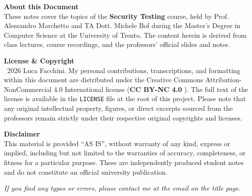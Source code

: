 \newpage
\thispagestyle{empty}
\vspace*{\fill} %
\noindent \textbf{About this Document}\\
These notes cover the topics of the \textbf{Security Testing} course, held by Prof. Alessandro Marchetto and TA Dott. Michele Bof during the Master's Degree in Computer Science at the University of Trento. The content herein is derived from class lectures, course recordings, and the professors' official slides and notes.

\vspace{1em}
\noindent \textbf{License \& Copyright}\\
\textcopyright\ 2026 Luca Facchini. My personal contributions, transcriptions, and formatting within this document are distributed under the Creative Commons Attribution-NonCommercial 4.0 International license (\textbf{CC BY-NC 4.0} \ccbynceu). The full text of the license is available in the \texttt{LICENSE} file at the root of this project. Please note that any original intellectual property, figures, or direct excerpts sourced from the professors remain strictly under their respective original copyrights and licenses.

\vspace{1em}
\noindent \textbf{Disclaimer}\\
This material is provided ``AS IS'', without warranty of any kind, express or implied, including but not limited to the warranties of accuracy, completeness, or fitness for a particular purpose. These are independently produced student notes and do not constitute an official university publication. 

\vspace{1em}
\noindent \textit{If you find any typos or errors, please contact me at the email on the title page.}
\vspace{2cm}

